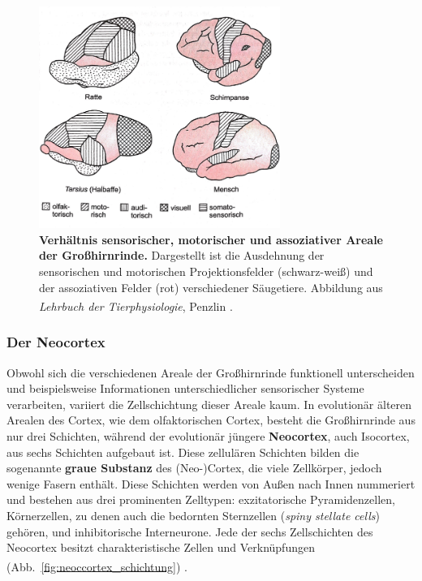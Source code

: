\documentclass[12pt,a4paper,pdftex]{article}
\begin{document}
\begin{figure}[H]
    \centering
    \includegraphics[width=0.7\textwidth]{pictures/Bilder_Jule/Andere/grosshirnrinde_vgl.png}
    \caption[Verhältnis sensorischer, motorischer und assoziativer Areale der Großhirnrinde.]{\textbf{Verhältnis sensorischer, motorischer und assoziativer Areale der Großhirnrinde.} Dargestellt ist die Ausdehnung der sensorischen und motorischen Projektionsfelder (schwarz-weiß) und der assoziativen Felder (rot) verschiedener Säugetiere. Abbildung aus \textit{Lehrbuch der Tierphysiologie}, Penzlin \textsuperscript{\cite[14]{penzlin2005tierphys}}.}
    \label{fig:grosshinrinde_vgl}
\end{figure}{}

\subsubsection*{Der Neocortex} 

Obwohl sich die verschiedenen Areale der Großhirnrinde funktionell unterscheiden und beispielsweise Informationen unterschiedlicher sensorischer Systeme verarbeiten, variiert die Zellschichtung dieser Areale kaum. In evolutionär älteren Arealen des Cortex, wie dem olfaktorischen Cortex, besteht die Großhirnrinde aus nur drei Schichten, während der evolutionär jüngere \textbf{Neocortex}, auch Isocortex, aus sechs Schichten aufgebaut ist. Diese zellulären Schichten bilden die sogenannte \textbf{graue Substanz} des (Neo-)Cortex, die viele Zellkörper, jedoch wenige Fasern enthält. Diese Schichten werden von Außen nach Innen nummeriert und bestehen aus drei prominenten Zelltypen: exzitatorische Pyramidenzellen, Körnerzellen, zu denen auch die bedornten Sternzellen (\textit{spiny stellate cells}) gehören, und inhibitorische Interneurone. Jede der sechs Zellschichten des Neocortex besitzt charakteristische Zellen und  Verknüpfungen (Abb.~\ref{fig:neoccortex_schichtung}) \textsuperscript{\cite[7]{watson2010thebrain}}. 
\end{document}
